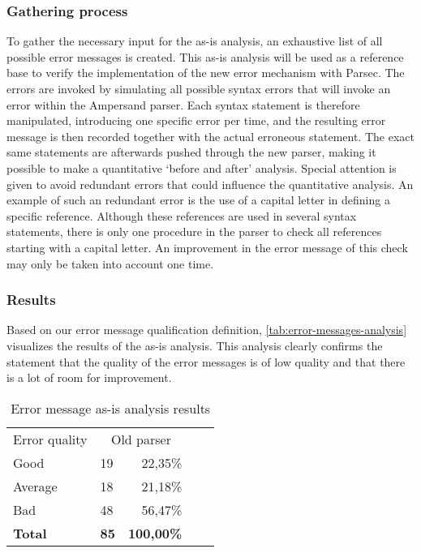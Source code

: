 \subsubsection{Gathering process}

To gather the necessary input for the as-is analysis, an exhaustive list of all possible error messages is created.
This as-is analysis will be used as a reference base to verify the implementation of the new error mechanism with Parsec.
The errors are invoked by simulating all possible syntax errors that will invoke an error within the Ampersand parser.
Each syntax statement is therefore manipulated, introducing one specific error per time, and the resulting error message is then recorded together with the actual erroneous statement.
The exact same statements are afterwards pushed through the new parser, making it possible to make a quantitative `before and after' analysis.
Special attention is given to avoid redundant errors that could influence the quantitative analysis. 
An example of such an redundant error is the use of a capital letter in defining a specific reference. 
Although these references are used in several syntax statements, there is only one procedure in the parser to check all references starting with a capital letter.
An improvement in the error message of this check may only be taken into account one time.

\subsubsection{Results}
Based on our error message qualification definition, \autoref{tab:error-messages-analysis} visualizes the results of the as-is analysis.
This analysis clearly confirms the statement that the quality of the error messages is of low quality and that there is a lot of room for improvement.

\begin{table}[h]
  \centering
	\begin{tabular}{llrlr}
    Error quality  & \multicolumn{2}{c}{Old parser}     \\
		Good           & 19          & 22,35\%         \\
		Average        & 18          & 21,18\%       \\
		Bad            & 48          & 56,47\%           \\
		\rowcolor[HTML]{BBBBBB}
		\textbf{Total} & \textbf{85} & \textbf{100,00\%} 
	\end{tabular}
  \caption{Error message as-is analysis results}
  \label{tab:error-messages-analysis}
\end{table}
